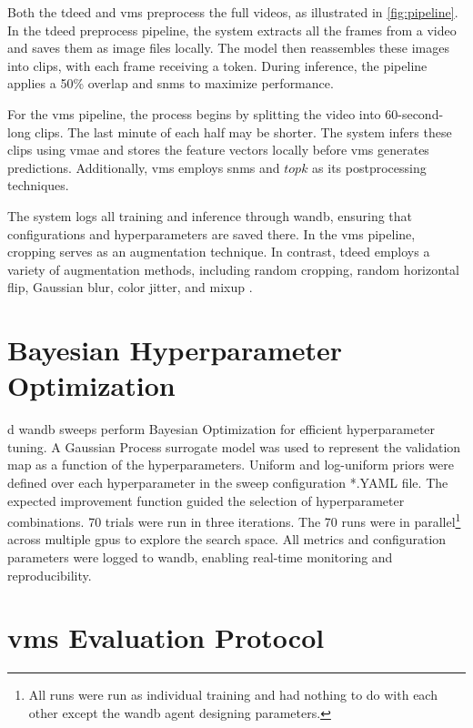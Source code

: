 Both the \acrfull{tdeed} and \acrfull{vms} preprocess the full videos, as illustrated in \cref{fig:pipeline}. In the \acrshort{tdeed} preprocess pipeline, the system extracts all the frames from a video and saves them as image files locally. The model then reassembles these images into clips, with each frame receiving a token. During inference, the pipeline applies a 50\% overlap and \acrfull{snms} to maximize performance.

For the \acrshort{vms} pipeline, the process begins by splitting the video into 60-second-long clips. The last minute of each half may be shorter. The system infers these clips using \acrshort{vmae} and stores the feature vectors locally before \acrshort{vms} generates predictions. Additionally, \acrshort{vms} employs \acrshort{snms} and $topk$ as its postprocessing techniques.

The system logs all training and inference through \acrfull{wandb}, ensuring that configurations and hyperparameters are saved there. In the \acrshort{vms} pipeline, cropping serves as an augmentation technique. In contrast, \acrshort{tdeed} employs a variety of augmentation methods, including random cropping, random horizontal flip, Gaussian blur, color jitter, and mixup \cite{xarles_t-deed_2024}.

\section{Bayesian Hyperparameter Optimization}
\label{sec:bayesian_optimization}

d \acrshort{wandb} sweeps perform Bayesian Optimization for efficient hyperparameter tuning. A Gaussian Process surrogate model was used to represent the validation \acrshort{map} as a function of the hyperparameters. Uniform and log-uniform priors were defined over each hyperparameter in the sweep configuration *.YAML file. The expected improvement function guided the selection of hyperparameter combinations. 70 trials were run in three iterations. The 70 runs were in parallel\footnote{All runs were run as individual training and had nothing to do with each other except the \acrshort{wandb} agent designing parameters.} across multiple \acrshort{gpu}s to explore the search space. All metrics and configuration parameters were logged to \acrshort{wandb}, enabling real-time monitoring and reproducibility. 


\section{\acrshort{vms} Evaluation Protocol}
\label{sec:eval_protocol}

